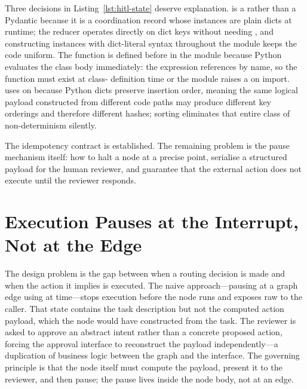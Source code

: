 Three decisions in Listing~\ref{lst:hitl-state} deserve explanation.
 is a  rather than a Pydantic
 because it is a coordination record whose instances
are plain dicts at runtime; the  reducer
operates directly on dict keys without needing ,
and constructing instances with dict-literal syntax throughout the module
keeps the code uniform. The  function is defined
before  in the module because Python evaluates the
class body immediately: the  expression references
 by name, so the function must exist at class-
definition time or the module raises a  on import.
 uses  on 
because Python dicts preserve insertion order, meaning the same logical
payload constructed from different code paths may produce different key
orderings and therefore different hashes; sorting eliminates that entire
class of non-determinism silently.

The idempotency contract is established. The remaining problem is the
pause mechanism itself: how to halt a node at a precise point, serialise
a structured payload for the human reviewer, and guarantee that the
external action does not execute until the reviewer responds.


\section{Execution Pauses at the Interrupt, Not at the Edge}
\label{sec:hitl-interrupt}

The design problem is the gap between when a routing decision is made and
when the action it implies is executed. The naive approach---pausing at a
graph edge using  at
 time---stops execution before the node runs and exposes
raw  to the caller. That state contains the task
description but not the computed action payload, which the node would have
constructed from the task. The reviewer is asked to approve an abstract
intent rather than a concrete proposed action, forcing the approval
interface to reconstruct the payload independently---a duplication of
business logic between the graph and the interface. The governing principle
is that the node itself must compute the payload, present it to the
reviewer, and then pause; the pause lives inside the node body, not at
an edge.

